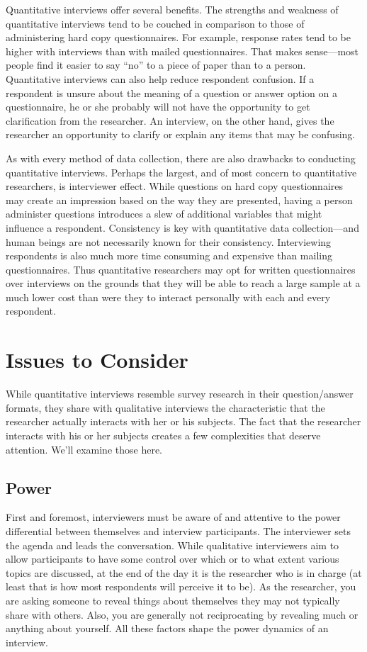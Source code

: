 Quantitative interviews offer several benefits. The strengths and weakness of quantitative interviews tend to be couched in comparison to those of administering hard copy questionnaires. For example, response rates tend to be higher with interviews than with mailed questionnaires. That makes sense---most people find it easier to say ``no'' to a piece of paper than to a person. Quantitative interviews can also help reduce respondent confusion. If a respondent is unsure about the meaning of a question or answer option on a questionnaire, he or she probably will not have the opportunity to get clarification from the researcher. An interview, on the other hand, gives the researcher an opportunity to clarify or explain any items that may be confusing.

As with every method of data collection, there are also drawbacks to conducting quantitative interviews. Perhaps the largest, and of most concern to quantitative researchers, is interviewer effect. While questions on hard copy questionnaires may create an impression based on the way they are presented, having a person administer questions introduces a slew of additional variables that might influence a respondent. Consistency is key with quantitative data collection---and human beings are not necessarily known for their consistency. Interviewing respondents is also much more time consuming and expensive than mailing questionnaires. Thus quantitative researchers may opt for written questionnaires over interviews on the grounds that they will be able to reach a large sample at a much lower cost than were they to interact personally with each and every respondent.

\section{Issues to Consider}

While quantitative interviews resemble survey research in their question/answer formats, they share with qualitative interviews the characteristic that the researcher actually interacts with her or his subjects. The fact that the researcher interacts with his or her subjects creates a few complexities that deserve attention. We’ll examine those here.

\subsection{Power}

First and foremost, interviewers must be aware of and attentive to the power differential between themselves and interview participants. The interviewer sets the agenda and leads the conversation. While qualitative interviewers aim to allow participants to have some control over which or to what extent various topics are discussed, at the end of the day it is the researcher who is in charge (at least that is how most respondents will perceive it to be). As the researcher, you are asking someone to reveal things about themselves they may not typically share with others. Also, you are generally not reciprocating by revealing much or anything about yourself. All these factors shape the power dynamics of an interview.

